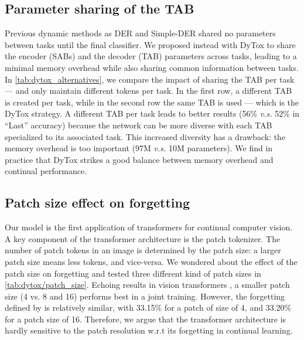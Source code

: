 


%

\subsection{Parameter sharing of the TAB}

Previous dynamic methods as DER \citep{yan2021der} and Simple-DER \citep{li2021preserve} shared no
parameters between tasks until the final classifier. We proposed instead with DyTox to share the
encoder (SABs) and the decoder (TAB) parameters across tasks, leading to a minimal memory overhead
while also sharing common information between tasks. In \autoref{tab:dytox_alternatives}, we compare the
impact of sharing the TAB per task --- and only maintain different tokens per task. In the first
row, a different TAB is created per task, while in the second row the same TAB is used --- which is
the DyTox strategy. A different TAB per task leads to better results (56\% \textit{v.s.} 52\% in
``Last'' accuracy) because the network can be more diverse with each TAB specialized to its
associated task. This increased diversity has a drawback: the memory overhead is too important (97M
\textit{v.s.} 10M parameters). We find in practice that DyTox strikes a good balance between memory
overhead and continual performance.


\subsection{Patch size effect on forgetting}

Our model is the first application of transformers for continual computer vision. A key component of
the transformer architecture is the patch tokenizer. The number of patch tokens in an image is
determined by the patch size: a larger patch size means less tokens, and vice-versa. We wondered
about the effect of the patch size on forgetting and tested three different kind of patch sizes in
\autoref{tab:dytox/patch_size}. Echoing results in vision transformers
\citep{dosovitskiy2020vit,touvron2021deit}, a smaller patch size (4 vs. 8 and 16) performs best in a
joint training. However, the forgetting defined by \citet{chaudhry2018riemannien_walk} is relatively similar, with 33.15\% for a patch of size of 4, and
33.20\% for a patch size of 16. Therefore, we argue that the transformer architecture is hardly
sensitive to the patch resolution w.r.t its forgetting in continual learning.

